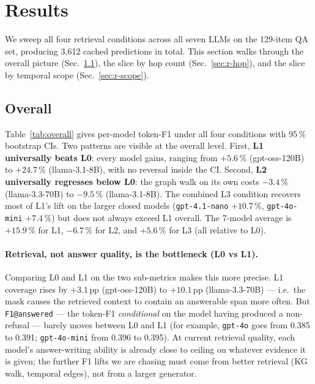 \documentclass[11pt]{article}
\begin{document}
\section{Results}
\label{sec:results}

We sweep all four retrieval conditions across all seven LLMs on the
129-item QA set, producing 3{,}612 cached predictions in total. This
section walks through the overall picture (Sec.~\ref{sec:r-overall}),
the slice by hop count (Sec.~\ref{sec:r-hop}), and the slice by
temporal scope (Sec.~\ref{sec:r-scope}).

\subsection{Overall}
\label{sec:r-overall}
Table~\ref{tab:overall} gives per-model token-F1 under all four
conditions with 95\,\% bootstrap CIs. Two patterns are visible at the
overall level. First, \textbf{L1 universally beats L0}: every model
gains, ranging from $+5.6\,\%$ (gpt-oss-120B) to $+24.7\,\%$
(llama-3.1-8B), with no reversal inside the CI. Second,
\textbf{L2 universally regresses below L0}: the graph walk on its own
costs $-3.4\,\%$ (llama-3.3-70B) to $-9.5\,\%$ (llama-3.1-8B). The
combined L3 condition recovers most of L1's lift on the larger
closed models (\texttt{gpt-4.1-nano} $+10.7\,\%$,
\texttt{gpt-4o-mini} $+7.4\,\%$) but does not always exceed L1
overall. The 7-model average is $+15.9\,\%$ for L1, $-6.7\,\%$ for
L2, and $+5.6\,\%$ for L3 (all relative to L0).

\paragraph{Retrieval, not answer quality, is the bottleneck (L0 vs L1).}
Comparing L0 and L1 on the two sub-metrics makes this more precise.
L1 coverage rises by $+3.1$\,pp (gpt-oss-120B) to $+10.1$\,pp
(llama-3.3-70B) --- i.e.\ the mask causes the retrieved context to
contain an answerable span more often. But \texttt{F1@answered} ---
the token-F1 \emph{conditional} on the model having produced a
non-refusal --- barely moves between L0 and L1 (for example,
\texttt{gpt-4o} goes from 0.385 to 0.391; \texttt{gpt-4o-mini} from
0.396 to 0.395). At current retrieval quality, each model's
answer-writing ability is already close to ceiling on whatever
evidence it is given; the further F1 lifts we are chasing must come
from better retrieval (KG walk, temporal edges), not from a larger
generator.
\end{document}
